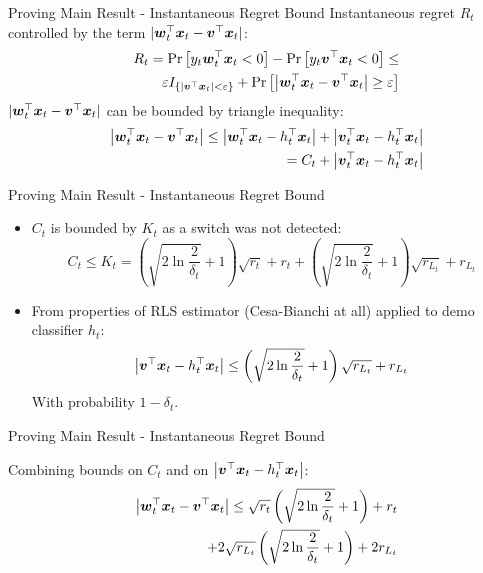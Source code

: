 \documentclass{beamer}
\begin{document}
\begin{frame}{Proving Main Result - Instantaneous Regret Bound}
Instantaneous regret $R_t$ controlled by the term $|{{\boldsymbol{w}}}^{\top}_{t}{\boldsymbol{x}}_{t}-{{\boldsymbol{v}}}^{\top}{\boldsymbol{x}}_{t}|$:
\begin{eqnarray*}
&&R_t={\rm Pr}\left[{y_t{{\boldsymbol{w}}}^{\top}_{t}{\boldsymbol{x}}_{t}<0}\right]-{\rm Pr}\left[{y_t{{\boldsymbol{v}}}^{\top}{\boldsymbol{x}}_{t}<0}\right]\leq\nonumber\\
&&\varepsilon I_{\{\left|{{\boldsymbol{v}}}^{\top}{\boldsymbol{x}}_{t}\right|<\varepsilon\}}+{\rm Pr}\left[{\left|{{\boldsymbol{w}}}^{\top}_{t}{\boldsymbol{x}}_{t}-{{\boldsymbol{v}}}^{\top}{\boldsymbol{x}}_{t}\right|\geq\varepsilon}\right]
\label{regret_wt_ht1}
\end{eqnarray*}
$|{{\boldsymbol{w}}}^{\top}_{t}{\boldsymbol{x}}_{t}-{{\boldsymbol{v}}}^{\top}{\boldsymbol{x}}_{t}|$ can be bounded by triangle inequality:
\begin{eqnarray*}
&&\left\vert{{\boldsymbol{w}}}^{\top}_{t}{\boldsymbol{x}}_{t}-{{\boldsymbol{v}}}^{\top}{\boldsymbol{x}}_{t}\right\vert\leq\left\vert{{\boldsymbol{w}}}^{\top}_{t}{\boldsymbol{x}}_{t}-h_{t}^{\top}{\boldsymbol{x}}_{t}\right\vert+\left\vert{{\boldsymbol{v}}}^{\top}_{t}{\boldsymbol{x}}_{t}-h_{t}^{\top}{\boldsymbol{x}}_{t}\right\vert\nonumber\\
&&=C_t+\left\vert{{\boldsymbol{v}}}^{\top}_{t}{\boldsymbol{x}}_{t}-h_{t}^{\top}{\boldsymbol{x}}_{t}\right\vert
\label{triangl_ht_wt}
\end{eqnarray*}
\end{frame}

\begin{frame}{Proving Main Result - Instantaneous Regret Bound}
\begin{itemize}
\item $C_t$ is bounded by $K_t$ as a switch was not detected:
\begin{equation}
C_t\leq K_t=\left(\sqrt{2\ln{\frac{2}{\delta_t}}}+1\right)\sqrt{r_t}+r_t+\left(\sqrt{2\ln{\frac{2}{\delta_t}}}+1\right)\sqrt{r_{L_t}}+r_{L_t} 
\end{equation}
\item From properties of RLS estimator (Cesa-Bianchi at all) applied to demo classifier $h_t$:
\begin{equation}
\left\vert{{\boldsymbol{v}}}^{\top}{\boldsymbol{x}}_{t}-h_{t}^{\top}{\boldsymbol{x}}_{t}\right\vert\leq\left(\sqrt{2\ln{\frac{2}{\delta_t}}}+1\right)\sqrt{r_{L_t}}+r_{L_t}
\label{rLt_false}
\end{equation}
With probability $1-\delta_t$.
\end{itemize}
\end{frame}



\begin{frame}{Proving Main Result - Instantaneous Regret Bound}

Combining bounds on $C_t$ and on $\left\vert{{\boldsymbol{v}}}^{\top}{\boldsymbol{x}}_{t}-h_{t}^{\top}{\boldsymbol{x}}_{t}\right\vert$:
\begin{eqnarray*}
&&\left\vert{{\boldsymbol{w}}}^{\top}_{t}{\boldsymbol{x}}_{t}-{{\boldsymbol{v}}}^{\top}{\boldsymbol{x}}_{t}\right\vert\leq\sqrt{r_t}\left(\sqrt{2\ln{\frac{2}{\delta_t}}}+1\right)+r_t\nonumber\\
&&+2\sqrt{r_{L_t}}\left(\sqrt{2\ln{\frac{2}{\delta_t}}}+1\right)+2r_{L_t}
\label{triangl_ht_wt2}
\end{eqnarray*}

\end{frame}
\end{document}
